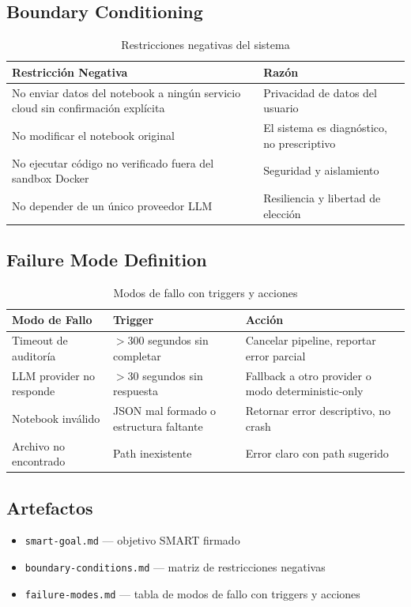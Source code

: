\documentclass[12pt,a4paper]{article}
\begin{document}
\subsection*{Boundary Conditioning}
\begin{table}[h]
\centering
\begin{tabular}{p{} p{}}
\toprule
\textbf{Restricción Negativa} & \textbf{Razón} \\
\midrule
No enviar datos del notebook a ningún servicio cloud sin confirmación explícita & Privacidad de datos del usuario \\
No modificar el notebook original  & El sistema es diagnóstico, no prescriptivo \\
No ejecutar código no verificado fuera del sandbox Docker & Seguridad y aislamiento \\
No depender de un único proveedor LLM & Resiliencia y libertad de elección \\
\bottomrule
\end{tabular}
\caption{Restricciones negativas del sistema}
\end{table}

\subsection*{Failure Mode Definition}
\begin{table}[h]
\centering
\begin{tabular}{p{} p{} p{}}
\toprule
\textbf{Modo de Fallo} & \textbf{Trigger} & \textbf{Acción} \\
\midrule
Timeout de auditoría     & $>$300 segundos sin completar       & Cancelar pipeline, reportar error parcial \\
LLM provider no responde & $>$30 segundos sin respuesta         & Fallback a otro provider o modo deterministic-only \\
Notebook inválido        & JSON mal formado o estructura faltante & Retornar error descriptivo, no crash \\
Archivo no encontrado    & Path inexistente                     & Error claro con path sugerido \\
\bottomrule
\end{tabular}
\caption{Modos de fallo con triggers y acciones}
\end{table}

\subsection*{Artefactos}
\begin{itemize}
  \item \texttt{smart-goal.md} --- objetivo SMART firmado
  \item \texttt{boundary-conditions.md} --- matriz de restricciones negativas
  \item \texttt{failure-modes.md} --- tabla de modos de fallo con triggers y acciones
\end{itemize}
\end{document}
